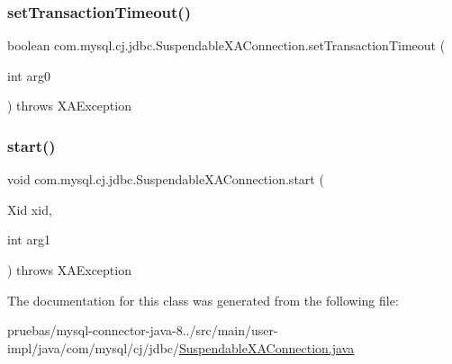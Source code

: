 \subsubsection{\texorpdfstring{set\+Transaction\+Timeout()}{setTransactionTimeout()}}
{\footnotesize\ttfamily boolean com.\+mysql.\+cj.\+jdbc.\+Suspendable\+X\+A\+Connection.\+set\+Transaction\+Timeout (\begin{DoxyParamCaption}\item[{int}]{arg0 }\end{DoxyParamCaption}) throws X\+A\+Exception}

\mbox{\label{classcom_1_1mysql_1_1cj_1_1jdbc_1_1_suspendable_x_a_connection_a8d0fbd3c10412c014ba642b955435d8c}} 
\subsubsection{\texorpdfstring{start()}{start()}}
{\footnotesize\ttfamily void com.\+mysql.\+cj.\+jdbc.\+Suspendable\+X\+A\+Connection.\+start (\begin{DoxyParamCaption}\item[{Xid}]{xid,  }\item[{int}]{arg1 }\end{DoxyParamCaption}) throws X\+A\+Exception}



The documentation for this class was generated from the following file\+:\begin{DoxyCompactItemize}
\item 
pruebas/mysql-\/connector-\/java-\/8../src/main/user-\/impl/java/com/mysql/cj/jdbc/\mbox{\hyperlink{_suspendable_x_a_connection_8java}{Suspendable\+X\+A\+Connection.\+java}}\end{DoxyCompactItemize}
